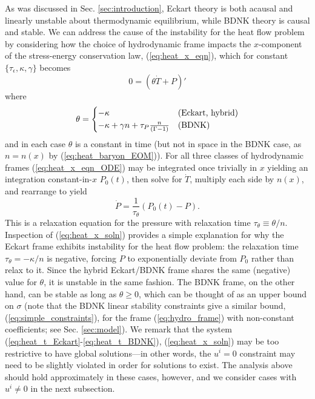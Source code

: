 \documentclass[%
notitlepage,
superscriptaddress,
nofootinbib,
amsmath,
amssymb,
aps,
twocolumn
]{revtex4-1}
\begin{document}
As was discussed in Sec. \ref{sec:introduction}, Eckart theory is both acausal and linearly unstable about thermodynamic equilibrium, while BDNK theory is causal and stable.  We can address the cause of the instability for the heat flow problem by considering how the choice of hydrodynamic frame impacts the $x$-component of the stress-energy conservation law, (\ref{eq:heat_x_eqn}), which for constant $\{\tau_{\epsilon}, \kappa, \gamma\}$ becomes
\begin{equation} \label{eq:heat_x_eqn_ODE}
0 = (\theta \dot{T} + P)'
\end{equation}
where
\begin{equation} \label{eq:heat_theta_defn}
\theta = 
\begin{cases}
-\kappa & \textnormal{(Eckart, hybrid)} \\
-\kappa + \gamma n + \tau_{P} \frac{n}{(\Gamma - 1)} & \textnormal{(BDNK)}
\end{cases}
\end{equation}
and in each case $\theta$ is a constant in time (but not in space in the BDNK case, as $n = n(x)$ by (\ref{eq:heat_baryon_EOM})).  For all three classes of hydrodynamic frames (\ref{eq:heat_x_eqn_ODE}) may be integrated once trivially in $x$ yielding an integration constant-in-$x$ $P_0(t)$, then solve for $\dot{T}$, multiply each side by $n(x)$, and rearrange to yield
\begin{equation} \label{eq:heat_x_soln}
\dot{P} = \frac{1}{\tau_{\theta}} (P_0(t) - P). 
\end{equation}
This is a relaxation equation for the pressure with relaxation time $\tau_{\theta} \equiv \theta/n$.  Inspection of (\ref{eq:heat_x_soln}) provides a simple explanation for why the Eckart frame exhibits instability for the heat flow problem: the relaxation time $\tau_{\theta} = -\kappa/n$ is negative, forcing $P$ to exponentially deviate from $P_0$ rather than relax to it.  Since the hybrid Eckart/BDNK frame shares the same (negative) value for $\theta$, it is unstable in the same fashion.  The BDNK frame, on the other hand, can be stable as long as $\theta \geq 0$, which can be thought of as an upper bound on $\sigma$ (note that the BDNK linear stability constraints give a similar bound, (\ref{eq:simple_constraints}), for the frame (\ref{eq:hydro_frame}) with non-constant coefficients; see Sec. \ref{sec:model}).
We remark that the system (\ref{eq:heat_t_Eckart}-\ref{eq:heat_t_BDNK}), (\ref{eq:heat_x_soln}) may be too restrictive to have global solutions---in other words, the $u^{i} = 0$ constraint may need to be slightly violated in order for solutions to exist.  The analysis above should hold approximately in these cases, however, and we consider cases with $u^{i} \neq 0$ in the next subsection.
\end{document}
